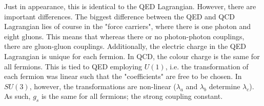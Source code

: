\documentclass[11pt,a4paper]{article}
\begin{document}
Just in appearance, this is identical to the QED Lagrangian. However, there are important differences. The biggest difference between the QED and QCD Lagrangian lies of course in the "force carriers", where there is one photon and eight gluons. This means that whereas there or no photon-photon couplings, there are gluon-gluon couplings. Additionally, the electric charge in the QED Lagrangian is unique for each fermion. In QCD, the colour charge is the same for all fermions. This is tied to QED employing $U(1)$, i.e. the transformation of each fermion was linear such that the "coefficients" are free to be chosen. In $SU(3)$, however, the transformations are non-linear ($\lambda_a$ and $\lambda_b$ determine $\lambda_c$). As such, $g_s$ is the same for all fermions; the strong coupling constant.
\end{document}

